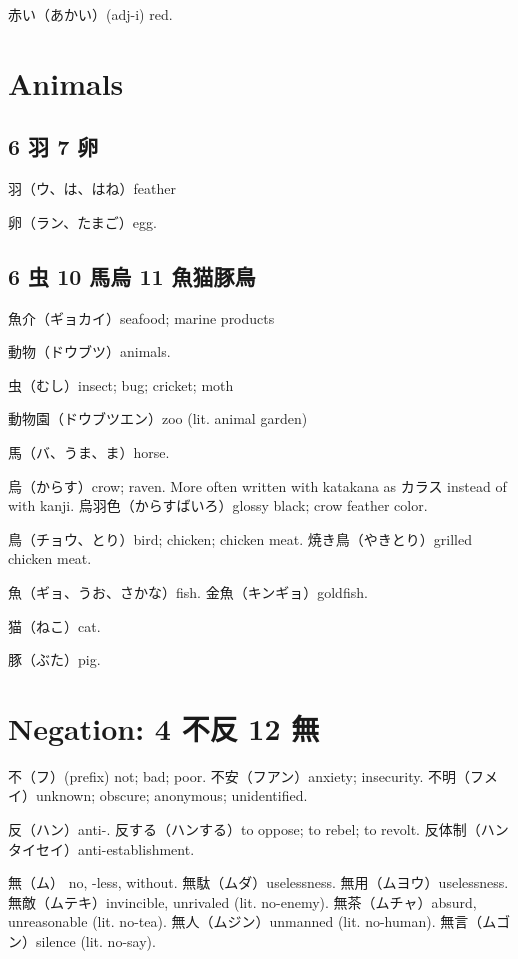 赤い（あかい）(adj-i) red.

\section{Animals}

\subsection{6 羽 7 卵}

羽（ウ、は、はね）feather

卵（ラン、たまご）egg.

\subsection{6 虫 10 馬烏 11 魚猫豚鳥}

魚介（ギョカイ）seafood; marine products

動物（ドウブツ）animals.

虫（むし）insect; bug; cricket; moth

動物園（ドウブツエン）zoo (lit. animal garden)

馬（バ、うま、ま）horse.

烏（からす）crow; raven.
More often written with katakana as カラス instead of with kanji.
烏羽色（からすばいろ）glossy black; crow feather color.

鳥（チョウ、とり）bird; chicken; chicken meat.
焼き鳥（やきとり）grilled chicken meat.

魚（ギョ、うお、さかな）fish.
金魚（キンギョ）goldfish.

猫（ねこ）cat.

豚（ぶた）pig.

\section{Negation: 4 不反 12 無}

不（フ）(prefix) not; bad; poor.
不安（フアン）anxiety; insecurity.
不明（フメイ）unknown; obscure; anonymous; unidentified.

反（ハン）anti-.
反する（ハンする）to oppose; to rebel; to revolt.
反体制（ハンタイセイ）anti-establishment.

無（ム） no, -less, without.
無駄（ムダ）uselessness.
無用（ムヨウ）uselessness.
無敵（ムテキ）invincible, unrivaled (lit. no-enemy).
無茶（ムチャ）absurd, unreasonable (lit. no-tea).
無人（ムジン）unmanned (lit. no-human).
無言（ムゴン）silence (lit. no-say).
